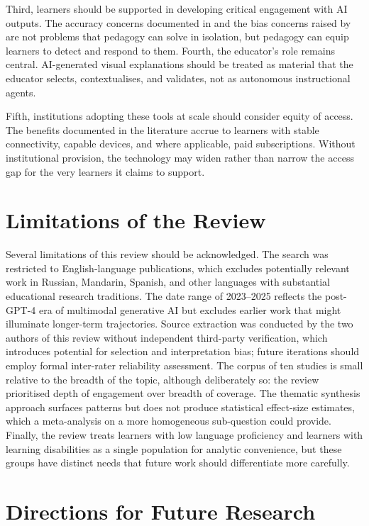 Third, learners should be supported in developing critical engagement with AI outputs. The accuracy concerns documented in \citet{buhler2024} and the bias concerns raised by \citet{ahmad2025} are not problems that pedagogy can solve in isolation, but pedagogy can equip learners to detect and respond to them. Fourth, the educator's role remains central. AI-generated visual explanations should be treated as material that the educator selects, contextualises, and validates, not as autonomous instructional agents.

Fifth, institutions adopting these tools at scale should consider equity of access. The benefits documented in the literature accrue to learners with stable connectivity, capable devices, and where applicable, paid subscriptions. Without institutional provision, the technology may widen rather than narrow the access gap for the very learners it claims to support.

\section{Limitations of the Review}

Several limitations of this review should be acknowledged. The search was restricted to English-language publications, which excludes potentially relevant work in Russian, Mandarin, Spanish, and other languages with substantial educational research traditions. The date range of 2023--2025 reflects the post-GPT-4 era of multimodal generative AI but excludes earlier work that might illuminate longer-term trajectories. Source extraction was conducted by the two authors of this review without independent third-party verification, which introduces potential for selection and interpretation bias; future iterations should employ formal inter-rater reliability assessment. The corpus of ten studies is small relative to the breadth of the topic, although deliberately so: the review prioritised depth of engagement over breadth of coverage. The thematic synthesis approach surfaces patterns but does not produce statistical effect-size estimates, which a meta-analysis on a more homogeneous sub-question could provide. Finally, the review treats learners with low language proficiency and learners with learning disabilities as a single population for analytic convenience, but these groups have distinct needs that future work should differentiate more carefully.

\section{Directions for Future Research}

